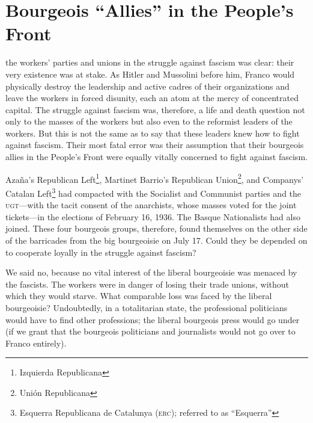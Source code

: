 \chapter{Bourgeois “Allies” in the People's Front}

 the workers’ parties and unions in the struggle against fascism was clear: their very existence was at stake. As Hitler and Mussolini before him, Franco{\indexFFranco} would physically destroy the leadership and active cadres of their organizations and leave the workers in forced disunity, each an atom at the mercy of concentrated capital. The struggle against fascism was, therefore, a life and death question not only to the masses of the workers but also even to the reformist leaders of the workers. But this is not the same as to say that these leaders knew how to fight against fascism. Their most fatal error was their assumption that their bourgeois allies in the People’s Front were equally vitally concerned to fight against fascism.

Azaña's Republican Left\footnote{Izquierda Republicana}, Martinet Barrio's Republican Union\footnote{Unión Republicana}, and Companys' Catalan Left\footnote{Esquerra Republicana de Catalunya (\textsc{erc}); referred to as ``Esquerra''} had compacted with the Socialist and Communist parties and the \textsc{ugt}---with the tacit consent of the anarchists, whose masses voted for the joint tickets---in the elections of February 16, 1936. The Basque Nationalists had also joined. These four bourgeois groups, therefore, found themselves on the other side of the barricades from the big bourgeoisie on July 17. Could they be depended on to cooperate loyally in the struggle against fascism?

We said no, because no vital interest of the liberal bourgeoisie was menaced by the fascists. The workers were in danger of losing their trade unions, without which they would starve. What comparable loss was faced by the liberal bourgeoisie? Undoubtedly, in a totalitarian state, the professional politicians would have to find other professions; the liberal bourgeois press would go under (if we grant that the bourgeois politicians and journalists would not go over to Franco entirely).
\noclub

